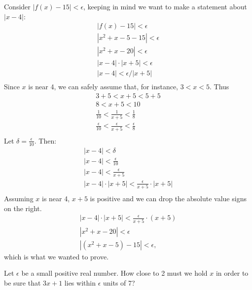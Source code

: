 \begin{enumialphparenastyle}
\begin{ex}
\begin{sol}
\begin{enumerate}
{Consider $|f(x)-15|<\epsilon$, keeping in  mind we want to make a statement about $|x-4|$:
\begin{gather*}
|f(x) -15 | < \epsilon \\
|x^2+x-5 -15 |<\epsilon \\
| x^2+x-20 | < \epsilon \\
| x-4 |\cdot|x+5| < \epsilon \\
| x-4 | < \epsilon/|x+5| \\
\end{gather*}
Since $x$ is near 4, we can safely assume that, for instance, $3<x<5$. Thus
\begin{gather*}
3+5<x+5<5+5 \\
8 < x+5 < 10 \\
\frac{1}{10} < \frac{1}{x+5} < \frac{1}{8} \\
\frac{\epsilon}{10} < \frac{\epsilon}{x+5} < \frac{\epsilon}{8} \\
\end{gather*}
Let $\delta =\frac{\epsilon}{10}$. Then:
\begin{gather*}
|x-4|<\delta \\
|x-4| < \frac{\epsilon}{10}\\
|x-4| < \frac{\epsilon}{x+5}\\
|x-4|\cdot|x+5| < \frac{\epsilon}{x+5}\cdot|x+5|\\
\end{gather*}
Assuming $x$ is near 4, $x+5$ is positive and we can drop the absolute value signs on the right.
\begin{gather*}
|x-4|\cdot|x+5| < \frac{\epsilon}{x+5}\cdot(x+5)\\
|x^2+x-20| < \epsilon\\
|(x^2+x-5) -15| < \epsilon,
\end{gather*}
which is what we wanted to prove.
}

\end{enumerate}
\end{sol}

\end{ex}


\begin{ex}
Let $\epsilon$ be a small positive real number. How close to 2 must we hold $x$ in order to be sure that $3x+1$ lies within $\epsilon$ units of 7?
\end{ex}

\end{enumialphparenastyle}

\clearpage